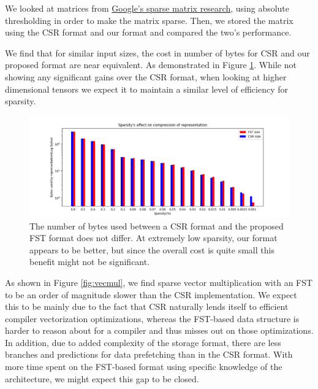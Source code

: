 \documentclass[12pt]{article}
\begin{document}
We looked at matrices from
\href{https://github.com/google-research/google-research/tree/master/state_of_sparsity}{Google's
sparse matrix research}\cite{StateOfSparsity}, using absolute thresholding in order to make the matrix sparse. Then,
we stored the matrix using the CSR format and our format and compared the two's performance.

We find that for similar input sizes, the cost in number of bytes for CSR and our proposed
format are near equivalent. As demonstrated in Figure \ref{fig:sparsity}. While not showing any
significant gains over the CSR format, when looking at higher dimensional tensors we expect it
to maintain a similar level of efficiency for sparsity.

\begin{center}
\begin{figure}
  \includegraphics[width=\textwidth]{sparsity}
  \caption{The number of bytes used between a CSR format and the proposed FST format does not
differ. At extremely low sparsity, our format appears to be better, but since the overall
cost is quite small this benefit might not be significant.}
  \label{fig:sparsity}
\end{figure}
\end{center}

As shown in Figure \ref{fig:vecmul}, we find sparse vector multiplication with an FST to be an
order of  magnitude slower than the CSR implementation. We expect this to be mainly due to the fact
that CSR naturally lends itself to efficient compiler vectorization optimizations, whereas the FST-based
data structure is harder to reason about for a compiler and thus misses out on those optimizations. In
addition, due to added complexity of the storage format, there are less branches and predictions
for data prefetching than in the CSR format. With more time spent on the FST-based format using
specific knowledge of the architecture, we might expect this gap to be closed.
\end{document}
